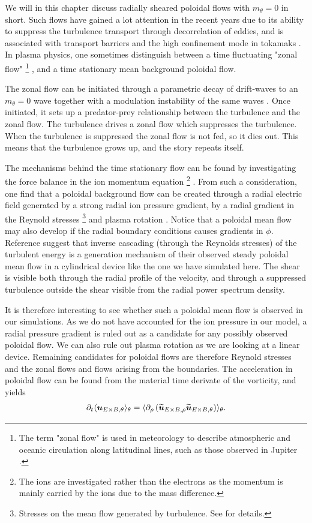We will in this chapter discuss radially sheared poloidal flows with $m_\theta = 0$ in short.
Such flows have gained a lot attention in the recent years due to its ability to suppress the turbulence transport through decorrelation of eddies, and is associated with transport barriers and the high confinement mode in tokamaks \cite{Terry2000,Diamond2005a,Viezzer2012Phd}.
In plasma physics, one sometimes distinguish between a time fluctuating "zonal flow"%
\footnote{The term "zonal flow" is used in meteorology to describe atmospheric and oceanic circulation along latitudinal lines, such as those observed in Jupiter \cite{Limaye1986}.}%
, and a time stationary mean background poloidal flow.

The zonal flow can be initiated through a parametric decay of drift-waves to an $m_\theta=0$ wave together with a modulation instability of the same waves \cite{Diamond2005a}.
Once initiated, it sets up a predator-prey relationship between the turbulence and the zonal flow.
The turbulence drives a zonal flow which suppresses the turbulence.
When the turbulence is suppressed the zonal flow is not fed, so it dies out.
This means that the turbulence grows up, and the story repeats itself.

The mechanisms behind the time stationary flow can be found by investigating the force balance in the ion momentum equation%
\footnote{The ions are investigated rather than the electrons as the momentum is mainly carried by the ions due to the mass difference.}%
%
.
From such a consideration, one find that a poloidal background flow can be created through a radial electric field generated by a strong radial ion pressure gradient, by a radial gradient in the Reynold stresses
\footnote{Stresses on the mean flow generated by turbulence.
See \cite{Kundu2010book} for details.}%
and plasma rotation \cite{Terry2000}.
Notice that a poloidal mean flow may also develop if the radial boundary conditions causes gradients in $\phi$.
Reference \cite{Tynan2006a} suggest that inverse cascading (through the Reynolds stresses) of the turbulent energy is a generation mechanism of their observed steady poloidal mean flow in a cylindrical device like the one we have simulated here.
The shear is visible both through the radial profile of the velocity, and through a suppressed turbulence outside the shear visible from the radial power spectrum density.

It is therefore interesting to see whether such a poloidal mean flow is observed in our simulations.
As we do not have accounted for the ion pressure in our model, a radial pressure gradient is ruled out as a candidate for any possibly observed poloidal flow.
We can also rule out plasma rotation as we are looking at a linear device.
Remaining candidates for poloidal flows are therefore Reynold stresses and the zonal flows and flows arising from the boundaries.
The acceleration in poloidal flow can be found from the material time derivate of the vorticity, and yields \cite{Diamond1991}
%
\begin{align*}
    \partial_t \langle{\boldsymbol{u}_{E\times B,\theta}}\rangle_\theta = \langle{\partial_\rho\left(\widetilde{ \boldsymbol{u}}_{E\times B,\rho}\widetilde{ \boldsymbol{u}}_{E\times B,\theta}\right)}\rangle_\theta.
\end{align*}
%

